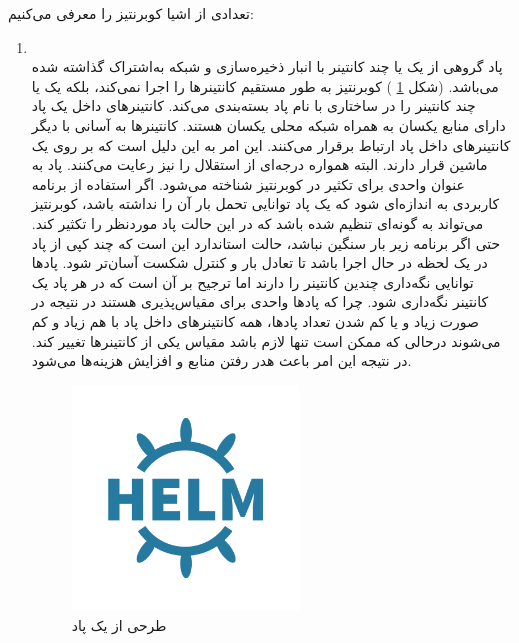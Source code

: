 تعدادی از اشیا کوبرنتیز را معرفی می‌کنیم:
\cite{sanche_2018}
\begin{enumerate}
	\item
	\\
	پاد گروهی از یک یا چند کانتینر با انبار ذخیره‌سازی  و شبکه به‌اشتراک‌ گذاشته‌ شده می‌باشد. (شکل
	\ref{تصویر 2-14}
	) کوبرنتیز به طور مستقیم کانتینرها را اجرا نمی‌کند، بلکه یک یا چند کانتینر را  در ساختاری با نام پاد بسته‌بندی می‌کند. کانتینرهای داخل یک پاد دارای منابع یکسان به همراه شبکه محلی یکسان هستند. کانتینرها به آسانی با دیگر کانتینرهای داخل پاد ارتباط برقرار می‌کنند. این امر به این دلیل است که بر روی یک ماشین قرار دارند. البته همواره درجه‌ای از استقلال را نیز رعایت می‌کنند. پاد به عنوان واحدی برای تکثیر در کوبرنتیز شناخته می‌شود. اگر استفاده از برنامه کاربردی به اندازه‌ای شود که یک پاد توانایی تحمل بار آن را نداشته باشد، کوبرنتیز می‌تواند به گونه‌ای تنظیم شده باشد که در این حالت پاد موردنظر را تکثیر کند. حتی اگر برنامه‌ زیر بار سنگین نباشد، حالت استاندارد این است که چند کپی از پاد در یک لحظه در حال اجرا باشد تا تعادل بار و کنترل شکست آسان‌تر شود.
	پادها توانایی نگه‌داری چندین کانتینر را دارند اما ترجیح بر آن است که در هر پاد یک کانتینر نگه‌داری شود. چرا که پادها واحدی برای مقیاس‌پذیری هستند در نتیجه در صورت زیاد و یا کم‌ شدن تعداد پادها، همه کانتینرهای داخل پاد با هم زیاد و کم می‌شوند در‌حالی که ممکن است تنها لازم باشد مقیاس یکی از کانتینرها تغییر کند. در نتیجه این امر باعث هدر رفتن منابع و افزایش هزینه‌ها می‌شود. 
	
	\begin{figure}[!h]
		\centering
		\includegraphics[height=6cm]{fig2-14}
		\caption{طرحی از یک پاد}
		\label{تصویر 2-14}
	\end{figure}
	

\end{enumerate}
